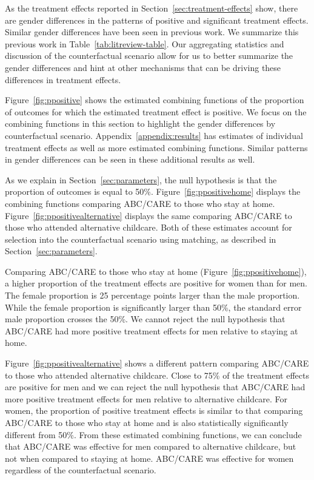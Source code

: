 
As the treatment effects reported in Section~\ref{sec:treatment-effects} show, there are gender differences in the patterns of positive and significant treatment effects. Similar gender differences have been seen in previous work. We summarize this previous work in Table~\ref{tab:litreview-table}. Our aggregating statistics and discussion of the counterfactual scenario allow for us to better summarize the gender differences and hint at other mechanisms that can be driving these differences in treatment effects.

Figure~\ref{fig:ppositive} shows the estimated combining functions of the proportion of outcomes for which the estimated treatment effect is positive. We focus on the combining functions in this section to highlight the gender differences by counterfactual scenario. Appendix~\ref{appendix:results} has estimates of individual treatment effects as well as more estimated combining functions. Similar patterns in gender differences can be seen in these additional results as well.

As we explain in Section~\ref{sec:parameters}, the null hypothesis is that the proportion of outcomes is equal to 50\%. Figure~\ref{fig:ppositivehome} displays the combining functions comparing ABC/CARE to those who stay at home. Figure~\ref{fig:ppositivealternative} displays the same comparing ABC/CARE to those who attended alternative childcare. Both of these estimates account for selection into the counterfactual scenario using matching, as described in Section~\ref{sec:parameters}.

Comparing ABC/CARE to those who stay at home (Figure~\ref{fig:ppositivehome}), a higher proportion of the treatment effects are positive for women than for men. The female proportion is 25 percentage points larger than the male proportion. While the female proportion is significantly larger than 50\%, the standard error male proportion crosses the 50\%. We cannot reject the null hypothesis that ABC/CARE had more positive treatment effects for men relative to staying at home. 

Figure~\ref{fig:ppositivealternative} shows a different pattern comparing ABC/CARE to those who attended alternative childcare. Close to 75\% of the treatment effects are positive for men and we can reject the null hypothesis that ABC/CARE had more positive treatment effects for men relative to alternative childcare. For women, the proportion of positive treatment effects is similar to that comparing ABC/CARE to those who stay at home and is also statistically significantly different from 50\%. From these estimated combining functions, we can conclude that ABC/CARE was effective for men compared to alternative childcare, but not when compared to staying at home. ABC/CARE was effective for women regardless of the counterfactual scenario. 


